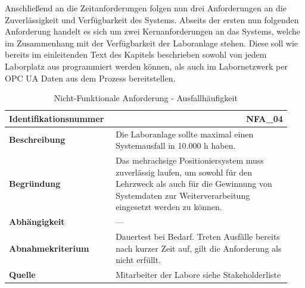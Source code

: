 \documentclass[../../../Bachelorarbeit.tex]{subfiles}
\begin{document}
Anschließend an die Zeitanforderungen folgen nun drei Anforderungen an die Zuverlässigkeit und Verfügbarkeit des Systems. Abseits der ersten nun folgenden Anforderung handelt es sich um zwei Kernanforderungen an das Systems, welche im Zusammenhang mit der Verfügbarkeit der Laboranlage stehen. Diese soll wie bereits im einleitenden Text des Kapitels beschrieben sowohl von jedem Laborplatz aus programmiert werden können, als auch im Labornetzwerk per OPC UA Daten aus dem Prozess bereitstellen.

\begin{table}[H]
    \centering
    \begin{tabular}{ p{0.34\linewidth}  p{0.6\linewidth} }
        \hline
        \textbf{Identifikationsnummer}  & \multicolumn{1}{r}{NFA\_04} \\ \hline
        \textbf{Beschreibung}           & Die Laboranlage sollte maximal einen Systemausfall in 10.000 \si{h} haben. \\
        \textbf{Begründung}             & Das mehrachsige Positioniersystem muss zuverlässig laufen, um sowohl für den Lehrzweck als auch für die Gewinnung von Systemdaten zur Weiterverarbeitung eingesetzt werden zu können. \\
        \textbf{Abhängigkeit}           & --- \\
        \textbf{Abnahmekriterium}       & Dauertest bei Bedarf. Treten Ausfälle bereits nach kurzer Zeit auf, gilt die Anforderung als nicht erfüllt. \\
        \textbf{Quelle}                 & Mitarbeiter der Labore siehe Stakeholderliste \\ \hline
    \end{tabular}
    \caption[\acs{nfa} - Ausfallhäufigkeit]{Nicht-Funktionale Anforderung - Ausfallhäufigkeit}
    \label{tab:my-table10}
\end{table}
\end{document}
